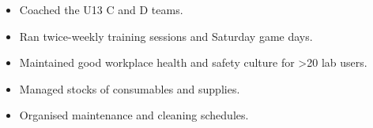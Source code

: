 

\begin{itemize}
    \item Coached the U13 C and D teams.
    \item Ran twice-weekly training sessions and Saturday game days.
\end{itemize}
\divider\smallskip

\begin{itemize}
    \item Maintained good workplace health and safety culture for >20 lab users.
    \item Managed stocks of consumables and supplies.
    \item Organised maintenance and cleaning schedules.
\end{itemize}









